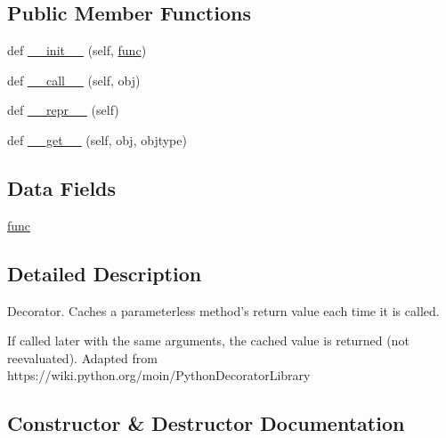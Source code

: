 \subsection*{Public Member Functions}
\begin{DoxyCompactItemize}
\item 
def \hyperlink{classvlc_1_1memoize__parameterless_a6b01c217ee3eb09aa88dc7a0bd3777dd}{\+\_\+\+\_\+init\+\_\+\+\_\+} (self, \hyperlink{classvlc_1_1memoize__parameterless_a3699148440db7bdde6e95e16092363d1}{func})
\item 
def \hyperlink{classvlc_1_1memoize__parameterless_a19bf7d343f18f2c15d27e224e41d61ea}{\+\_\+\+\_\+call\+\_\+\+\_\+} (self, obj)
\item 
def \hyperlink{classvlc_1_1memoize__parameterless_a9a47563093dfc5ba12274b66e368920c}{\+\_\+\+\_\+repr\+\_\+\+\_\+} (self)
\item 
def \hyperlink{classvlc_1_1memoize__parameterless_ac12ab989c1cc5844c9b561a591975564}{\+\_\+\+\_\+get\+\_\+\+\_\+} (self, obj, objtype)
\end{DoxyCompactItemize}
\subsection*{Data Fields}
\begin{DoxyCompactItemize}
\item 
\hyperlink{classvlc_1_1memoize__parameterless_a3699148440db7bdde6e95e16092363d1}{func}
\end{DoxyCompactItemize}


\subsection{Detailed Description}
\begin{DoxyVerb}Decorator. Caches a parameterless method's return value each time it is called.

If called later with the same arguments, the cached value is returned
(not reevaluated).
Adapted from https://wiki.python.org/moin/PythonDecoratorLibrary
\end{DoxyVerb}
 

\subsection{Constructor \& Destructor Documentation}
\mbox{\label{classvlc_1_1memoize__parameterless_a6b01c217ee3eb09aa88dc7a0bd3777dd}} 
